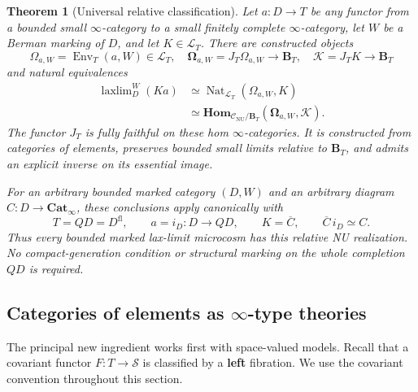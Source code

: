 \documentclass[oneside]{article}
\theoremstyle{plain}
\newtheorem{theorem}{Theorem}[section]
\theoremstyle{definition}
\theoremstyle{remark}
\newcommand{\B}{\mathbf B}
\newcommand{\CNU}{\mathcal C_{\mathrm{NU}}}
\newcommand{\Cat}{\mathbf{Cat}_{\infty}}
\newcommand{\Env}{\operatorname{Env}}
\newcommand{\Homc}{\mathbf{Hom}}
\newcommand{\J}{J}
\newcommand{\LT}{\mathcal L_T}
\newcommand{\Nat}{\operatorname{Nat}}
\newcommand{\Om}{\boldsymbol\Omega}
\newcommand{\Sps}{\mathcal S}
\newcommand{\cK}{\mathcal K}
\newcommand{\ff}{\mathrm{fl}}
\newcommand{\laxlim}{\mathop{\mathrm{laxlim}}}
\begin{document}
\begin{theorem}[Universal relative classification]\label{thm:main}
Let $a:D\to T$ be any functor from a bounded small $\infty$-category to a small finitely complete $\infty$-category, let $W$ be a Berman marking of $D$, and let $K\in\LT$. There are constructed objects
\[
 \Omega_{a,W}=\Env_T(a,W)\in\LT,
 \quad \Om_{a,W}=\J_T\Omega_{a,W}\longrightarrow\B_T,
 \quad \cK=\J_TK\longrightarrow\B_T
\]
and natural equivalences
\begin{align}
 \laxlim\nolimits_D^W(Ka)
 &\simeq \Nat_{\LT}(\Omega_{a,W},K)\label{eq:main1}\\
 &\simeq \Homc_{\CNU/\B_T}(\Om_{a,W},\cK).
 \label{eq:main2}
\end{align}
The functor $\J_T$ is fully faithful on these hom $\infty$-categories. It is constructed from categories of elements, preserves bounded small limits relative to $\B_T$, and admits an explicit inverse on its essential image.

For an arbitrary bounded marked category $(D,W)$ and an arbitrary diagram $C:D\to\Cat$, these conclusions apply canonically with
\[
 T=QD=D^{\ff},\qquad a=i_D:D\to QD,\qquad K=\overline C,
 \qquad \overline C\,i_D\simeq C.
\]
Thus every bounded marked lax-limit microcosm has this relative NU realization. No compact-generation condition or structural marking on the whole completion $QD$ is required.
\end{theorem}

\subsection{\texorpdfstring{Categories of elements as $\infty$-type theories}{Categories of elements as infinity-type theories}}

The principal new ingredient works first with space-valued models. Recall that a covariant functor $F:T\to\Sps$ is classified by a \textbf{left} fibration. We use the covariant convention throughout this section.
\end{document}
